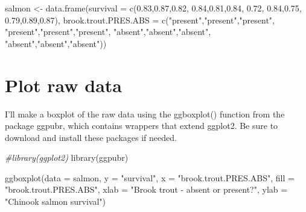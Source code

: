 \documentclass[
]{book}
\newenvironment{Shaded}{\begin{snugshade}}{\end{snugshade}}
\newcommand{\AttributeTok}[1]{\textcolor[rgb]{0.77,0.63,0.00}{#1}}
\newcommand{\CommentTok}[1]{\textcolor[rgb]{0.56,0.35,0.01}{\textit{#1}}}
\newcommand{\FloatTok}[1]{\textcolor[rgb]{0.00,0.00,0.81}{#1}}
\newcommand{\FunctionTok}[1]{\textcolor[rgb]{0.00,0.00,0.00}{#1}}
\newcommand{\NormalTok}[1]{#1}
\newcommand{\OtherTok}[1]{\textcolor[rgb]{0.56,0.35,0.01}{#1}}
\newcommand{\StringTok}[1]{\textcolor[rgb]{0.31,0.60,0.02}{#1}}
\begin{document}
\begin{Shaded}
\begin{Highlighting}[]
\NormalTok{salmon }\OtherTok{\textless{}{-}} \FunctionTok{data.frame}\NormalTok{(}\AttributeTok{survival =} \FunctionTok{c}\NormalTok{(}\FloatTok{0.83}\NormalTok{,}\FloatTok{0.87}\NormalTok{,}\FloatTok{0.82}\NormalTok{,}
                                  \FloatTok{0.84}\NormalTok{,}\FloatTok{0.81}\NormalTok{,}\FloatTok{0.84}\NormalTok{,}
                                  \FloatTok{0.72}\NormalTok{, }\FloatTok{0.84}\NormalTok{,}\FloatTok{0.75}\NormalTok{,}
                                  \FloatTok{0.79}\NormalTok{,}\FloatTok{0.89}\NormalTok{,}\FloatTok{0.87}\NormalTok{),}
                     \AttributeTok{brook.trout.PRES.ABS =}
                       \FunctionTok{c}\NormalTok{(}\StringTok{"present"}\NormalTok{,}\StringTok{"present"}\NormalTok{,}\StringTok{"present"}\NormalTok{,            }
                         \StringTok{"present"}\NormalTok{,}\StringTok{"present"}\NormalTok{,}\StringTok{"present"}\NormalTok{,}
                          \StringTok{"absent"}\NormalTok{,}\StringTok{"absent"}\NormalTok{,}\StringTok{"absent"}\NormalTok{,}
                          \StringTok{"absent"}\NormalTok{,}\StringTok{"absent"}\NormalTok{,}\StringTok{"absent"}\NormalTok{))}
\end{Highlighting}
\end{Shaded}

\hypertarget{plot-raw-data}{%
\section{Plot raw data}\label{plot-raw-data}}

I'll make a boxplot of the raw data using the ggboxplot() function from the package ggpubr, which contains wrappers that extend ggplot2. Be sure to download and install these packages if needed.

\begin{Shaded}
\begin{Highlighting}[]
\CommentTok{\#library(ggplot2)}
\FunctionTok{library}\NormalTok{(ggpubr)}

\FunctionTok{ggboxplot}\NormalTok{(}\AttributeTok{data =}\NormalTok{ salmon,}
          \AttributeTok{y =} \StringTok{"survival"}\NormalTok{,}
          \AttributeTok{x =} \StringTok{"brook.trout.PRES.ABS"}\NormalTok{,}
          \AttributeTok{fill =} \StringTok{"brook.trout.PRES.ABS"}\NormalTok{,}
          \AttributeTok{xlab =} \StringTok{"Brook trout {-} absent or present?"}\NormalTok{,}
          \AttributeTok{ylab =} \StringTok{"Chinook salmon survival"}\NormalTok{)}
\end{Highlighting}
\end{Shaded}
\end{document}
